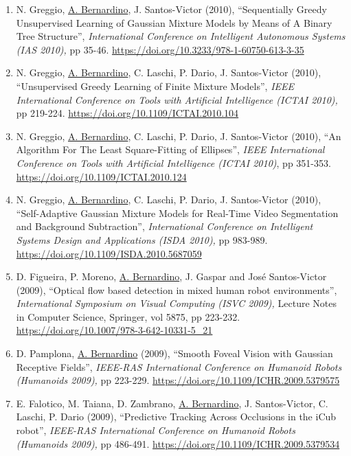 \documentclass[
]{article}
\begin{document}
\begin{enumerate}
{  (ICIAR 2010),} Lecture Notes in Computer Science, Springer, vol 6111,
  pp 105-116. \url{https://doi.org/10.1007/978-3-642-13772-3_12}~
\item
  N. Greggio, \ul{A. Bernardino}, J. Santos-Victor (2010),
  ``Sequentially Greedy Unsupervised Learning of Gaussian Mixture Models
  by Means of A Binary Tree Structure'', \emph{International Conference
  on Intelligent Autonomous Systems (IAS 2010),} pp 35-46.
  \url{https://doi.org/10.3233/978-1-60750-613-3-35}~
\item
  N. Greggio, \ul{A. Bernardino}, C. Laschi, P. Dario, J. Santos-Victor
  (2010), ``Unsupervised Greedy Learning of Finite Mixture Models'',
  \emph{IEEE International Conference on Tools with Artificial
  Intelligence (ICTAI 2010),} pp 219-224.
  \url{https://doi.org/10.1109/ICTAI.2010.104}~
\item
  N. Greggio, \ul{A. Bernardino}, C. Laschi, P. Dario, J. Santos-Victor
  (2010), ``An Algorithm For The Least Square-Fitting of Ellipses'',
  \emph{IEEE International Conference on Tools with Artificial
  Intelligence (ICTAI 2010)}, pp 351-353.
  \url{https://doi.org/10.1109/ICTAI.2010.124}~
\item
  N. Greggio, \ul{A. Bernardino}, C. Laschi, P. Dario, J. Santos-Victor
  (2010), ``Self-Adaptive Gaussian Mixture Models for Real-Time Video
  Segmentation and Background Subtraction'', \emph{International
  Conference on Intelligent Systems Design and Applications (ISDA
  2010),} pp 983-989. \url{https://doi.org/10.1109/ISDA.2010.5687059}~
\item
  D. Figueira, P. Moreno, \ul{A. Bernardino}, J. Gaspar and José
  Santos-Victor (2009), ``Optical flow based detection in mixed human
  robot environments'', \emph{International Symposium on Visual
  Computing (ISVC 2009),} Lecture Notes in Computer Science, Springer,
  vol 5875, pp 223-232.
  \url{https://doi.org/10.1007/978-3-642-10331-5_21}~
\item
  D. Pamplona, \ul{A. Bernardino} (2009), ``Smooth Foveal Vision with
  Gaussian Receptive Fields'', \emph{IEEE-RAS International Conference
  on Humanoid Robots (Humanoids 2009),} pp 223-229.
  \url{https://doi.org/10.1109/ICHR.2009.5379575}~
\item
  E. Falotico, M. Taiana, D. Zambrano, \ul{A. Bernardino}, J.
  Santos-Victor, C. Laschi, P. Dario (2009), ``Predictive Tracking
  Across Occlusions in the iCub robot'', \emph{IEEE-RAS International
  Conference on Humanoid Robots (Humanoids 2009),} pp 486-491.
  \url{https://doi.org/10.1109/ICHR.2009.5379534}~

\end{enumerate}
\end{document}
